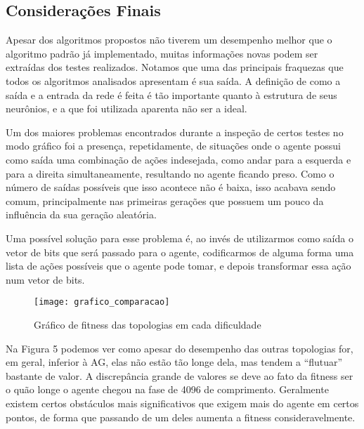 \documentclass[a4paper,12pt]{article}
\begin{document}
    \subsection{Considerações Finais}
      Apesar dos algoritmos propostos não tiverem um desempenho melhor que o algoritmo 
      padrão já implementado, muitas informações novas podem ser extraídas dos testes 
      realizados. Notamos que uma das principais fraquezas que todos os algoritmos 
      analisados apresentam é sua saída. A definição de como a saída e a entrada da 
      rede é feita é tão importante quanto à estrutura de seus neurônios, e a que foi 
      utilizada aparenta não ser a ideal.
    
      Um dos maiores problemas encontrados durante a inspeção de certos testes no modo 
      gráfico foi a presença, repetidamente, de situações onde o agente possui como 
      saída uma combinação de ações indesejada, como andar para a esquerda e para a 
      direita simultaneamente, resultando no agente ficando preso. Como o número de 
      saídas possíveis que isso acontece não é baixa, isso acabava sendo comum, 
      principalmente nas primeiras gerações que possuem um pouco da influência da 
      sua geração aleatória.
    
      Uma possível solução para esse problema é, ao invés de utilizarmos como saída 
      o vetor de bits que será passado para o agente, codificarmos de alguma forma 
      uma lista de ações possíveis que o agente pode tomar, e depois transformar 
      essa ação num vetor de bits.

      \begin{figure}[!htb]
	\centering
	\texttt{[image: grafico\_comparacao]}
	\caption{Gráfico de fitness das topologias em cada dificuldade}
	\label{Figura 5}
      \end{figure}
      
      Na Figura 5 podemos ver como apesar do desempenho das outras topologias 
      for, em geral, inferior à AG, elas não estão tão longe dela, mas tendem a 
      “flutuar” bastante de valor. A discrepância grande de valores se deve ao fato da 
      fitness ser o quão longe o agente chegou na fase de 4096 de comprimento. 
      Geralmente existem certos obstáculos mais significativos que exigem mais do 
      agente em certos pontos, de forma que passando de um deles aumenta a fitness 
      consideravelmente.
    
  
\end{document}
